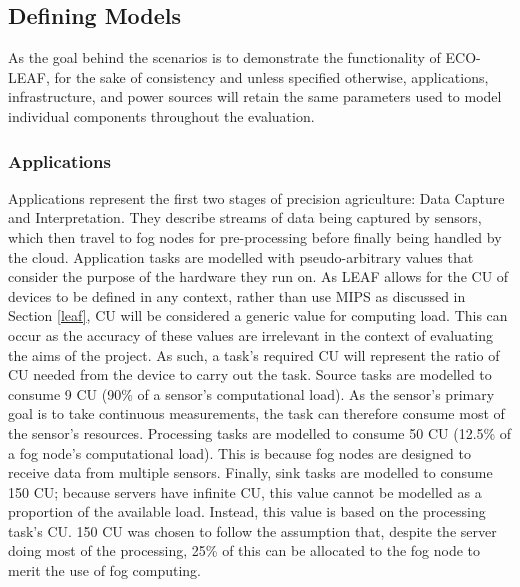 \documentclass{l4proj}
\begin{document}
\subsection{Defining Models}\label{eval:subsec:modelling}
As the goal behind the scenarios is to demonstrate the functionality of ECO-LEAF, for the sake of consistency and unless specified otherwise, applications, infrastructure, and power sources will retain the same parameters used to model individual components throughout the evaluation.
\subsubsection{Applications}
Applications represent the first two stages of precision agriculture: Data Capture and Interpretation.
They describe streams of data being captured by sensors, which then travel to fog nodes for pre-processing before finally being handled by the cloud.
Application tasks are modelled with pseudo-arbitrary values that consider the purpose of the hardware they run on.
As LEAF allows for the CU of devices to be defined in any context, rather than use MIPS as discussed in Section \ref{leaf}, CU will be considered a generic value for computing load.
This can occur as the accuracy of these values are irrelevant in the context of evaluating the aims of the project.
As such, a task's required CU will represent the ratio of CU needed from the device to carry out the task.
Source tasks are modelled to consume 9 CU (90\% of a sensor's computational load). As the sensor's primary goal is to take continuous measurements, the task can therefore consume most of the sensor's resources.
Processing tasks are modelled to consume 50 CU (12.5\% of a fog node's computational load). This is because fog nodes are designed to receive data from multiple sensors.
Finally, sink tasks are modelled to consume 150 CU; because servers have infinite CU, this value cannot be modelled as a proportion of the available load.
Instead, this value is based on the processing task's CU. 150 CU was chosen to follow the assumption that, despite the server doing most of the processing, 25\% of this can be allocated to the fog node to merit the use of fog computing.
\end{document}
